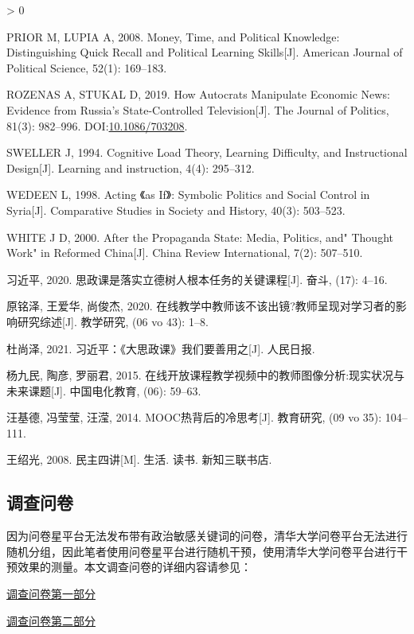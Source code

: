 \documentclass[
  12pt,
]{ctexart}
\newlength{\cslhangindent}
\newenvironment{CSLReferences}[2] %
 {%
  \setlength{\parindent}{0pt}
  \ifodd #1 \everypar{\setlength{\hangindent}{\cslhangindent}}\ignorespaces\fi
  \ifnum #2 > 0
  \setlength{\parskip}{#2\baselineskip}
  \fi
 }%
 {}
\begin{document}
\begin{CSLReferences}{1}{0}
\leavevmode\hypertarget{ref-PriorLupia2008}{}%
PRIOR M, LUPIA A, 2008. Money, Time, and Political Knowledge: {Distinguishing} Quick Recall and Political Learning Skills{[}J{]}. American Journal of Political Science, 52(1): 169--183.

\leavevmode\hypertarget{ref-RozenasStukal2019}{}%
ROZENAS A, STUKAL D, 2019. How {Autocrats Manipulate Economic News}: {Evidence} from {Russia}'s {State}-{Controlled Television}{[}J{]}. The Journal of Politics, 81(3): 982--996. DOI:\href{https://doi.org/10.1086/703208}{10.1086/703208}.

\leavevmode\hypertarget{ref-Sweller1994}{}%
SWELLER J, 1994. Cognitive Load Theory, Learning Difficulty, and Instructional Design{[}J{]}. Learning and instruction, 4(4): 295--312.

\leavevmode\hypertarget{ref-Wedeen1998}{}%
WEDEEN L, 1998. Acting {《as If》}: Symbolic Politics and Social Control in {Syria}{[}J{]}. Comparative Studies in Society and History, 40(3): 503--523.

\leavevmode\hypertarget{ref-White2000}{}%
WHITE J D, 2000. After the {Propaganda State}: {Media}, {Politics}, and" {Thought Work}" in {Reformed China}{[}J{]}. China Review International, 7(2): 507--510.

\leavevmode\hypertarget{ref-XiJinPing2020}{}%
习近平, 2020. {思政课是落实立德树人根本任务的关键课程}{[}J{]}. 奋斗, (17): 4--16.

\leavevmode\hypertarget{ref-YuanMingZeEtAl2020a}{}%
原铭泽, 王爱华, 尚俊杰, 2020. {在线教学中教师该不该出镜?{}{}教师呈现对学习者的影响研究综述}{[}J{]}. 教学研究, (06 vo 43): 1--8.

\leavevmode\hypertarget{ref-DuShangZe2021}{}%
杜尚泽, 2021. 习近平：{《大思政课》}我们要善用之{[}J{]}. 人民日报.

\leavevmode\hypertarget{ref-YangJiuMinEtAl2015}{}%
杨九民, 陶彦, 罗丽君, 2015. {在线开放课程教学视频中的教师图像分析:现实状况与未来课题}{[}J{]}. 中国电化教育, (06): 59--63.

\leavevmode\hypertarget{ref-WangJiDeEtAl2014}{}%
汪基德, 冯莹莹, 汪滢, 2014. {MOOC热背后的冷思考}{[}J{]}. 教育研究, (09 vo 35): 104--111.

\leavevmode\hypertarget{ref-WangShaoGuang2008}{}%
王绍光, 2008. {民主四讲}{[}M{]}. {生活. 读书. 新知三联书店}.

\end{CSLReferences}

\break

\hypertarget{appendix-supplementary-materials}{%
\appendix}


\hypertarget{ux8c03ux67e5ux95eeux5377}{%
\subsection{调查问卷}\label{ux8c03ux67e5ux95eeux5377}}

因为问卷星平台无法发布带有政治敏感关键词的问卷，清华大学问卷平台无法进行随机分组，因此笔者使用问卷星平台进行随机干预，使用清华大学问卷平台进行干预效果的测量。本文调查问卷的详细内容请参见：

\href{https://civtemoe.wjx.cn/vj/wdJmKjm.aspx}{调查问卷第一部分}

\href{http://wenjuan.tsinghua.edu.cn/s/vem6Jj/}{调查问卷第二部分}
\end{document}
